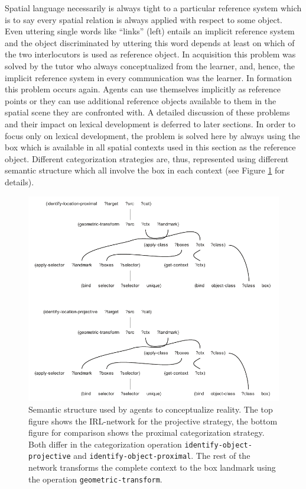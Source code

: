Spatial language necessarily is always tight to a particular reference system which
is to say every spatial relation is always applied with respect to some
object. Even uttering single words like ``links'' (left) entails an implicit reference
system and the object discriminated by uttering this word depends at least on which
of the two interlocutors is used as reference object. In acquisition this problem 
was solved by the tutor who always conceptualized from the learner, and, hence, 
the implicit reference system in every communication was the learner. In formation
this problem occurs again. Agents can use themselves implicitly as reference points
or they can use additional reference objects available to them in the spatial
scene they are confronted with. A detailed discussion of these
problems and their impact on lexical development is deferred to later sections. 
In order to focus only on lexical development, the problem is solved here by 
always using the box which is available in all spatial
contexts used in this section as the reference object. Different categorization 
strategies are, thus, represented using different semantic structure which all 
involve the box in each context (see Figure \ref{f:categorization-strategies} for
details).

\begin{figure}
\begin{center}
\includegraphics[width=1.0\columnwidth]{figs/category-formation-categorization-strategies}
\end{center}
\caption[Example strategies used in conceptualization]{
Semantic structure used by agents to conceptualize reality. The top figure
shows the IRL-network for the projective strategy, the bottom figure for
comparison shows the proximal categorization strategy. Both differ in 
the categorization operation {\footnotesize\tt identify-object-projective} and
{\footnotesize\tt identify-object-proximal}. The rest of the network
transforms the complete context to the box landmark using the operation 
{\footnotesize\tt geometric-transform}.}
\label{f:categorization-strategies}
\end{figure}

